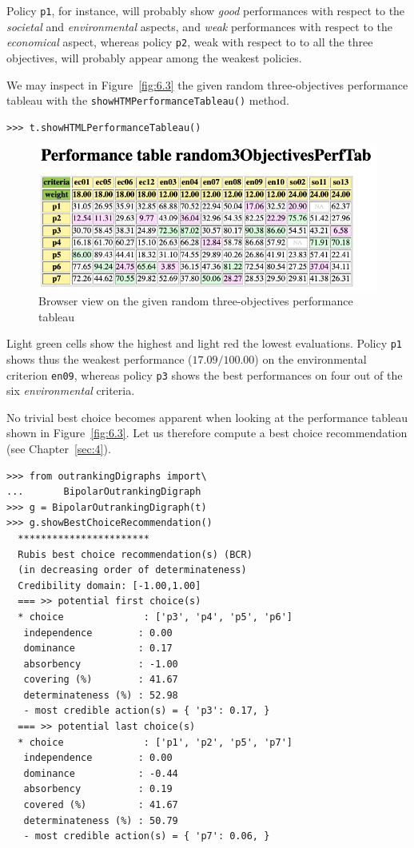 Policy \texttt{p1}, for instance, will probably show \emph{good} performances with respect to the \emph{societal} and \emph{environmental} aspects, and \emph{weak} performances with respect to the \emph{economical} aspect, whereas policy \texttt{p2}, weak with respect to to all the three objectives, will probably appear among the weakest policies.

We may inspect in Figure~\vref{fig:6.3} the given random three-objectives performance tableau with the \texttt{showHTMPerformanceTableau()} method.
\begin{lstlisting}
>>> t.showHTMLPerformanceTableau()
\end{lstlisting}
\begin{figure}[ht]
\includegraphics[width=\hsize]{Figures/6-3-random3ObjPerfTab.png}
\caption{Browser view on the given random three-objectives performance tableau}
\label{fig:6.3}       %
\end{figure}

Light green cells show the highest and light red the lowest evaluations. Policy \texttt{p1} shows thus the weakest performance ($17.09/100.00$) on the environmental criterion \texttt{en09}, whereas policy \texttt{p3} shows the best performances on four out of the six \emph{environmental} criteria.

No trivial best choice becomes apparent when looking at the performance tableau shown in Figure~\vref{fig:6.3}. Let us therefore compute a \Rubis best choice recommendation (see Chapter~\vref{sec:4}).
\begin{lstlisting}[caption={What is the public policy to recommend as best choice ?},label=list:6.4]
>>> from outrankingDigraphs import\
...       BipolarOutrankingDigraph
>>> g = BipolarOutrankingDigraph(t)
>>> g.showBestChoiceRecommendation()
  ***********************
  Rubis best choice recommendation(s) (BCR)
  (in decreasing order of determinateness)   
  Credibility domain: [-1.00,1.00]
  === >> potential first choice(s)
  * choice              : ['p3', 'p4', 'p5', 'p6']
   independence        : 0.00
   dominance           : 0.17
   absorbency          : -1.00
   covering (%)        : 41.67
   determinateness (%) : 52.98
   - most credible action(s) = { 'p3': 0.17, }
  === >> potential last choice(s) 
  * choice              : ['p1', 'p2', 'p5', 'p7']
   independence        : 0.00
   dominance           : -0.44
   absorbency          : 0.19
   covered (%)         : 41.67
   determinateness (%) : 50.79
   - most credible action(s) = { 'p7': 0.06, }
\end{lstlisting}

